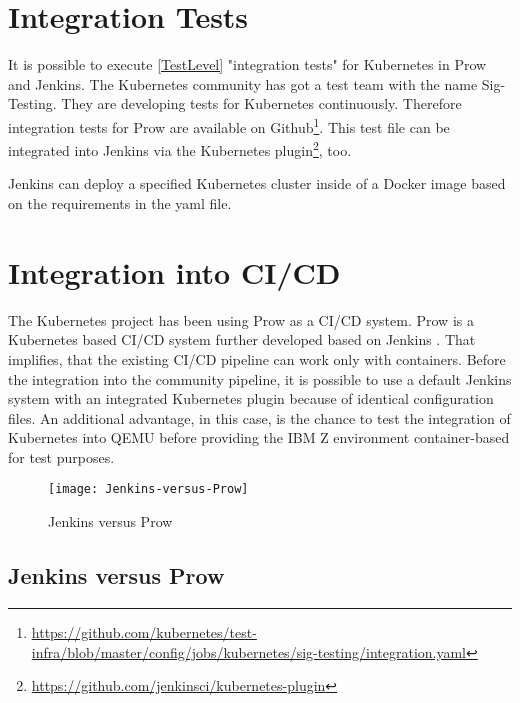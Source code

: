 \section{Integration Tests} \label{Kub-IntegrationTest}

It is possible to execute \ref{TestLevel} "integration tests" for Kubernetes in Prow and Jenkins.
The Kubernetes community has got a test team with the name Sig-Testing. They are developing tests for Kubernetes continuously. Therefore integration tests for Prow are available on Github\footnote{\url{https://github.com/kubernetes/test-infra/blob/master/config/jobs/kubernetes/sig-testing/integration.yaml}}. This test file can be integrated into Jenkins via the Kubernetes plugin\footnote{\url{https://github.com/jenkinsci/kubernetes-plugin}}, too.

Jenkins can deploy a specified Kubernetes cluster inside of a Docker image based on the requirements in the yaml file.

\section{Integration into CI/CD}

The Kubernetes project has been using Prow as a \gls{CI/CD} system. Prow is a Kubernetes based \gls{CI/CD} system further developed based on Jenkins \cite{JAXenter}. That implifies, that the existing \gls{CI/CD} pipeline can work only with containers.
Before the integration into the community pipeline, it is possible to use a default Jenkins system with an integrated Kubernetes plugin because of identical configuration files. An additional advantage, in this case, is the chance to test the integration of Kubernetes into \gls{QEMU} before providing the IBM Z environment container-based for test purposes.

\begin{figure}[H]
\centering
\texttt{[image: Jenkins-versus-Prow]}
 \caption{Jenkins versus Prow}
    \label{JenkinsProw}
\end{figure}


\subsection{Jenkins versus Prow}


